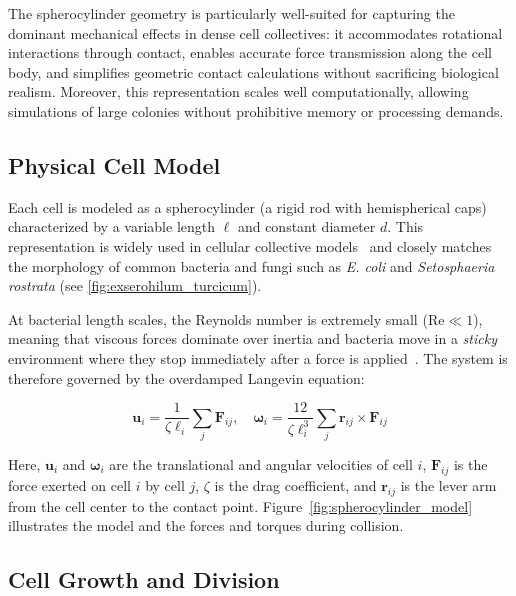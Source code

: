\documentclass[conference]{IEEEtran}
\begin{document}
The spherocylinder geometry is particularly well-suited for capturing the dominant mechanical effects in dense cell collectives: it accommodates rotational interactions through contact, enables accurate force transmission along the cell body, and simplifies geometric contact calculations without sacrificing biological realism. Moreover, this representation scales well computationally, allowing simulations of large colonies without prohibitive memory or processing demands.

\subsection{Physical Cell Model}

Each cell is modeled as a spherocylinder (a rigid rod with hemispherical caps) characterized by a variable length $\ell$ and constant diameter $d$. This representation is widely used in cellular collective models~\cite{You2018, Weady2024, Blanchard2015, Warren2019, Ghosh2015} and closely matches the morphology of common bacteria and fungi such as \textit{E. coli} and \textit{Setosphaeria rostrata} (see \autoref{fig:exserohilum_turcicum}).

At bacterial length scales, the Reynolds number is extremely small ($\text{Re} \ll 1$), meaning that viscous forces dominate over inertia and bacteria move in a \textit{sticky} environment where they stop immediately after a force is applied~\cite{datta2024lifelowreynoldsnumber,Rudge2012}. The system is therefore governed by the overdamped Langevin equation:

\begin{equation} \label{eq:overdamped_langevin}
    \mathbf{u}_i = \frac{1}{\zeta \ell_i} \sum_j \mathbf{F}_{ij}, \quad
    \boldsymbol{\omega}_i = \frac{12}{\zeta \ell_i^3} \sum_j \mathbf{r}_{ij} \times \mathbf{F}_{ij}
\end{equation}

Here, $\mathbf{u}_i$ and $\boldsymbol{\omega}_i$ are the translational and angular velocities of cell $i$, $\mathbf{F}_{ij}$ is the force exerted on cell $i$ by cell $j$, $\zeta$ is the drag coefficient, and $\mathbf{r}_{ij}$ is the lever arm from the cell center to the contact point. Figure~\ref{fig:spherocylinder_model} illustrates the model and the forces and torques during collision.

\subsection{Cell Growth and Division}
\end{document}
